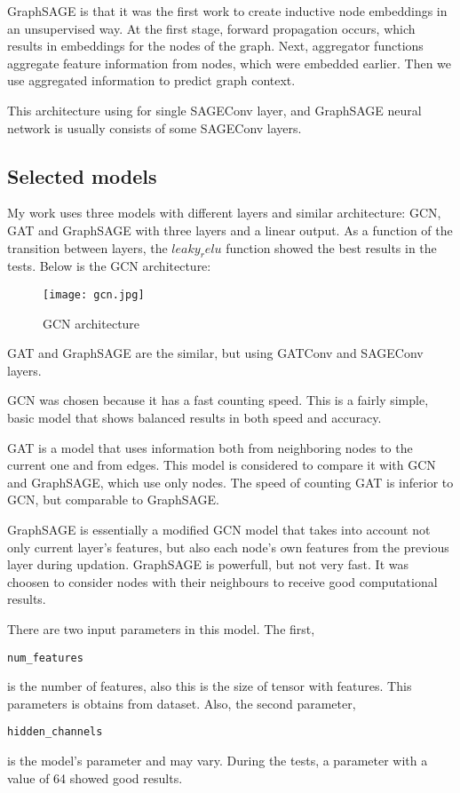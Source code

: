 \documentclass[a4paper,14pt]{article}
\begin{document}
GraphSAGE is that it was the first work to create inductive node embeddings in an unsupervised way. At the first stage, forward propagation occurs, which results in embeddings for the nodes of the graph. Next, aggregator functions aggregate feature information from nodes, which were embedded earlier. Then we use aggregated information to predict graph context.

This architecture using for single SAGEConv layer, and GraphSAGE neural network is usually consists of some SAGEConv layers.

\subsection{Selected models}
My work uses three models with different layers and similar architecture:
GCN, GAT and GraphSAGE with three layers and a linear output. As a function of the transition between layers, the $leaky_relu$ function showed the best results in the tests. Below is the GCN architecture:
\newline

\begin{figure}[H]
    \centering
    \texttt{[image: gcn.jpg]}
    \caption{GCN architecture}
\end{figure}

GAT and GraphSAGE are the similar, but using GATConv and SAGEConv layers.

GCN was chosen because it has a fast counting speed. This is a fairly simple, basic model that shows balanced results in both speed and accuracy.

GAT is a model that uses information both from neighboring nodes to the current one and from edges. This model is considered to compare it with GCN and GraphSAGE, which use only nodes. The speed of counting GAT is inferior to GCN, but comparable to GraphSAGE.

GraphSAGE is essentially a modified GCN model that takes into account not only current layer's features, but also each node’s own features from the previous layer during updation. GraphSAGE is powerfull, but not very fast. It was choosen to consider nodes with their neighbours to receive good computational results.

There are two input parameters in this model. The first, \begin{verbatim}num_features\end{verbatim} is the number of features, also this is the size of tensor with features. This parameters is obtains from dataset.
Also, the second parameter, \begin{verbatim}hidden_channels\end{verbatim} is the model's parameter and may vary. During the tests, a parameter with a value of 64 showed good results.
\end{document}
